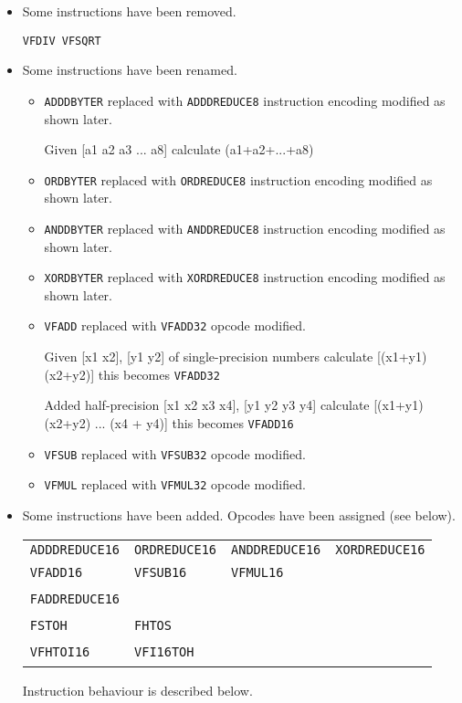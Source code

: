 \documentclass{book}
\begin{document}
\begin{itemize}
\item Some instructions have been removed.

  \texttt{VFDIV VFSQRT}

\item Some instructions have been renamed.

  \begin{itemize}
  \item   \texttt{ADDDBYTER}    replaced   with   \texttt{ADDDREDUCE8}
    instruction encoding modified as shown later.

    Given [a1 a2 a3 ... a8] calculate (a1+a2+...+a8)
  \item    \texttt{ORDBYTER}    replaced   with    \texttt{ORDREDUCE8}
    instruction encoding modified as shown later.
  \item   \texttt{ANDDBYTER}    replaced   with   \texttt{ANDDREDUCE8}
    instruction encoding modified as shown later.
  \item   \texttt{XORDBYTER}    replaced   with   \texttt{XORDREDUCE8}
    instruction encoding modified as shown later.
  \item \texttt{VFADD} replaced with \texttt{VFADD32} opcode modified.

    Given  [x1  x2], [y1  y2]  of  single-precision numbers  calculate
    [(x1+y1) (x2+y2)] this becomes \texttt{VFADD32}

    Added  half-precision [x1  x2  x3  x4], [y1  y2  y3 y4]  calculate
    [(x1+y1) (x2+y2) ... (x4 + y4)] this becomes \texttt{VFADD16}
   \item \texttt{VFSUB} replaced with \texttt{VFSUB32} opcode modified.
   \item \texttt{VFMUL} replaced with \texttt{VFMUL32} opcode modified.
  \end{itemize}

\item Some instructions have been added.  Opcodes have been assigned (see
  below).

  \begin{tabular}[h]{p{.25\linewidth}p{.25\linewidth}p{.25\linewidth}p{.25\linewidth}}
  \texttt{ADDDREDUCE16}&\texttt{ORDREDUCE16}&\texttt{ANDDREDUCE16}&
  \texttt{XORDREDUCE16}\\
  \texttt{VFADD16}&\texttt{VFSUB16}&\texttt{VFMUL16}&~\\
  \texttt{FADDREDUCE16}&~&~&~\\
  \texttt{FSTOH}&\texttt{FHTOS}&~&~\\
  \texttt{VFHTOI16}&\texttt{VFI16TOH}&~&~
  \end{tabular}
  Instruction behaviour is described below.
\end{itemize}
\end{document}
